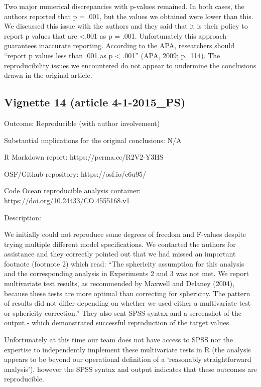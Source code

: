\documentclass[english,,man,floatsintext]{apa6}
\begin{document}
\begin{appendix}
Two major numerical discrepancies with p-values remained. In both cases,
the authors reported that p = .001, but the values we obtained were
lower than this. We discussed this issue with the authors and they said
that it is their policy to report p values that are \textless{}.001 as p
= .001. Unfortunately this approach guarantees inaccurate reporting.
According to the APA, researchers should ``report p values less than
.001 as p \textless{} .001'' (APA, 2009; p.~114). The reproducibility
issues we encountered do not appear to undermine the conclusions drawn
in the original article.

\hypertarget{vignette-14-article-4-1-2015_ps}{%
\subsection{Vignette 14 (article
4-1-2015\_PS)}\label{vignette-14-article-4-1-2015_ps}}

Outcome: Reproducible (with author involvement)

Substantial implications for the original conclusions: N/A

R Markdown report: https://perma.cc/R2V2-Y3HS

OSF/Github repository: https://osf.io/c6u95/

Code Ocean reproducible analysis container:
https://doi.org/10.24433/CO.4555168.v1

Description:

We initially could not reproduce some degrees of freedom and F-values
despite trying multiple different model specifications. We contacted the
authors for assistance and they correctly pointed out that we had missed
an important footnote (footnote 2) which read: ``The sphericity
assumption for this analysis and the corresponding analysis in
Experiments 2 and 3 was not met. We report multivariate test results, as
recommended by Maxwell and Delaney (2004), because these tests are more
optimal than correcting for sphericity. The pattern of results did not
differ depending on whether we used either a multivariate test or
sphericity correction.'' They also sent SPSS syntax and a screenshot of
the output - which demonstrated successful reproduction of the target
values.

Unfortunately at this time our team does not have access to SPSS nor the
expertise to independently implement these multivariate tests in R (the
analysis appears to be beyond our operational definition of a
`reasonably straightforward analysis'), however the SPSS syntax and
output indicates that these outcomes are reproducible.


\end{appendix}
\end{document}
